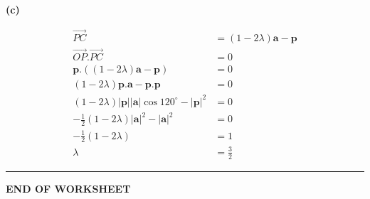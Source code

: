 \documentclass[a4paper,11pt,oneside]{book}
\begin{document}
\par\smallskip\noindent\textbf{(c)}\par\nopagebreak{}\begin{align*}\overrightarrow{PC}&=(1-2\lambda)\mathbf a-\mathbf p\\ \overrightarrow{OP}.\overrightarrow{PC}&=0\\ \mathbf p.((1-2\lambda)\mathbf a-\mathbf p)&=0\\ (1-2\lambda)\mathbf p.\mathbf a-\mathbf p.\mathbf p&=0\\ (1-2\lambda)|\mathbf p||\mathbf a|\cos120^\circ-|\mathbf p|^2&=0\\ -\tfrac12(1-2\lambda)|\mathbf a|^2-|\mathbf a|^2&=0\\ -\tfrac12(1-2\lambda)&=1\\ \lambda&=\frac32\end{align*}
\par\medskip\hrule\medskip
\par\vspace{\baselineskip}\begin{center}\textbf{END OF WORKSHEET}\end{center}
\end{document}

